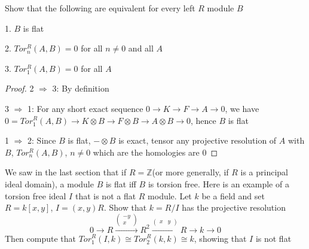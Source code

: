 \documentclass{article}
\newenvironment{exercise}[2][Exercise]{\begin{trivlist}
\item[\hskip \labelsep {\bfseries #1}\hskip \labelsep {\bfseries #2.}]}{\end{trivlist}}
\theoremstyle{definition}
\theoremstyle{remark}
\theoremstyle{definition}
\begin{document}
\begin{exercise}{\textbf{3.2.1}}
Show that the following are equivalent for every left $R$ module $B$ \par
1. $B$ is flat \par
2. $Tor_n^R(A,B)=0$ for all $n\neq0$ and all $A$ \par
3. $Tor_1^R(A,B)=0$ for all $A$ \par
\end{exercise}

\begin{proof}
2 $\Rightarrow$ 3: By definition \par
3 $\Rightarrow$ 1: For any short exact sequence $0\to K\to F\to A\to0$, we have $0=Tor^R_1(A,B)\to K\otimes B\to F\otimes B\to A\otimes B\to0$, hence $B$ is flat \par
1 $\Rightarrow$ 2: Since $B$ is flat, $-\otimes B$ is exact, tensor any projective resolution of $A$ with $B$, $Tor^R_n(A,B)$, $n\neq0$ which are the homologies are $0$
\end{proof}

\begin{exercise}{\textbf{3.2.3}}
We saw in the last section that if $R=\mathbb Z$(or more generally, if $R$ is a principal ideal domain), a module $B$ is flat iff $B$ is torsion free. Here is an example of a torsion free ideal $I$ that is not a flat $R$ module. Let $k$ be a field and set $R=k[x,y]$, $I=(x,y)R$. Show that $k=R/I$ has the projective resolution
\[0\to R\xrightarrow{\begin{pmatrix}
-y\\
x
\end{pmatrix}}R^2\xrightarrow{\begin{pmatrix}
x&y
\end{pmatrix}}R\to k\to0\]
Then compute that $Tor_1^R(I,k)\cong Tor_2^R(k,k)\cong k$, showing that $I$ is not flat
\end{exercise}
\end{document}

